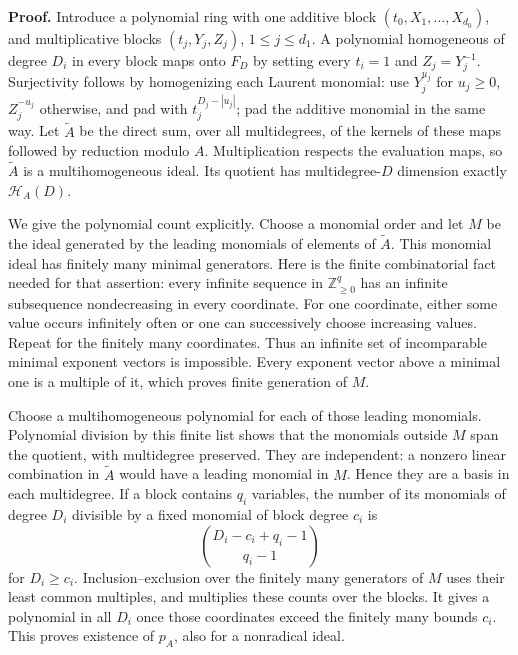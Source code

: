 \documentclass[
  11pt,
  a4paper,
]{article}
\begin{document}
\textbf{Proof.} Introduce a polynomial ring with one additive block
\((t_0,X_1,\ldots,X_{d_0})\), and multiplicative blocks
\((t_j,Y_j,Z_j)\), \(1\le j\le d_1\). A polynomial homogeneous of degree
\(D_i\) in every block maps onto \(F_D\) by setting every \(t_i=1\) and
\(Z_j=Y_j^{-1}\). Surjectivity follows by homogenizing each Laurent
monomial: use \(Y_j^{u_j}\) for \(u_j\ge0\), \(Z_j^{-u_j}\) otherwise,
and pad with \(t_j^{D_j-|u_j|}\); pad the additive monomial in the same
way. Let \(\widetilde A\) be the direct sum, over all multidegrees, of
the kernels of these maps followed by reduction modulo \(A\).
Multiplication respects the evaluation maps, so \(\widetilde A\) is a
multihomogeneous ideal. Its quotient has multidegree-\(D\) dimension
exactly \(\mathcal H_A(D)\).

We give the polynomial count explicitly. Choose a monomial order and let
\(M\) be the ideal generated by the leading monomials of elements of
\(\widetilde A\). This monomial ideal has finitely many minimal
generators. Here is the finite combinatorial fact needed for that
assertion: every infinite sequence in \(\mathbb Z_{\ge0}^q\) has an
infinite subsequence nondecreasing in every coordinate. For one
coordinate, either some value occurs infinitely often or one can
successively choose increasing values. Repeat for the finitely many
coordinates. Thus an infinite set of incomparable minimal exponent
vectors is impossible. Every exponent vector above a minimal one is a
multiple of it, which proves finite generation of \(M\).

Choose a multihomogeneous polynomial for each of those leading
monomials. Polynomial division by this finite list shows that the
monomials outside \(M\) span the quotient, with multidegree preserved.
They are independent: a nonzero linear combination in \(\widetilde A\)
would have a leading monomial in \(M\). Hence they are a basis in each
multidegree. If a block contains \(q_i\) variables, the number of its
monomials of degree \(D_i\) divisible by a fixed monomial of block
degree \(c_i\) is \[
\binom{D_i-c_i+q_i-1}{q_i-1}
\] for \(D_i\ge c_i\). Inclusion--exclusion over the finitely many
generators of \(M\) uses their least common multiples, and multiplies
these counts over the blocks. It gives a polynomial in all \(D_i\) once
those coordinates exceed the finitely many bounds \(c_i\). This proves
existence of \(p_A\), also for a nonradical ideal.
\end{document}
